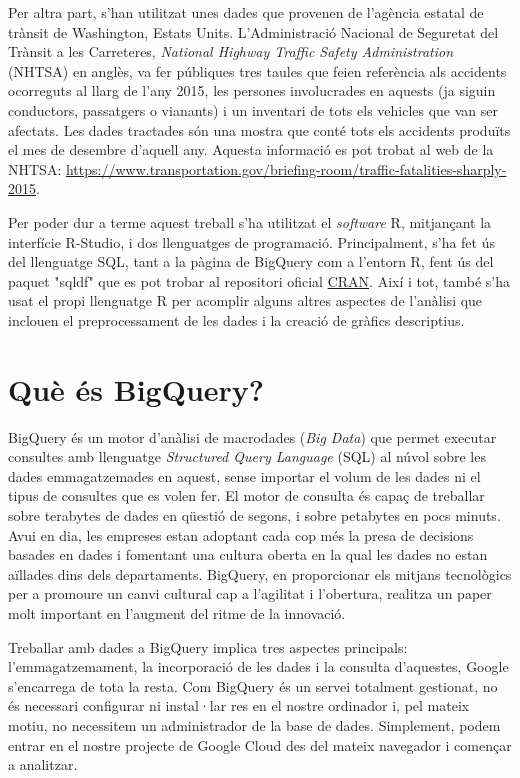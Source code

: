 \documentclass[12pt,longbibliography]{article}
\theoremstyle{definition}
\theoremstyle{remark}
\begin{document}
Per altra part, s'han utilitzat unes dades que provenen de l'agència estatal de trànsit de Washington, Estats Units. L'Administració Nacional de Seguretat del Trànsit a les Carreteres, \textit{National Highway Traffic Safety Administration} (NHTSA) en anglès, va fer públiques tres taules que feien referència als accidents ocorreguts al llarg de l'any 2015, les persones involucrades en aquests (ja siguin conductors, passatgers o vianants) i un inventari de tots els vehicles que van ser afectats. Les dades tractades són una mostra que conté tots els accidents produïts el mes de desembre d'aquell any. Aquesta informació es pot trobat al web de la NHTSA: \url{https://www.transportation.gov/briefing-room/traffic-fatalities-sharply-2015}.

Per poder dur a terme aquest treball s'ha utilitzat el \textit{software} R, mitjançant la interfície R-Studio, i dos llenguatges de programació. Principalment, s'ha fet ús del llenguatge SQL, tant a la pàgina de BigQuery com a l'entorn R, fent ús del paquet "sqldf" que es pot trobar al repositori oficial \href{https://cran.r-project.org}{CRAN}. Així i tot, també s'ha usat el propi llenguatge R per acomplir alguns altres aspectes de l'anàlisi que inclouen el preprocessament de les dades i la creació de gràfics descriptius.

\pagebreak

\section{Què és BigQuery?}

BigQuery és un motor d’anàlisi de macrodades (\textit{Big Data}) que permet executar consultes amb llenguatge \emph{Structured Query Language} (SQL) al núvol sobre les dades emmagatzemades en aquest, sense importar el volum de les dades ni el tipus de consultes que es volen fer. El motor de consulta és capaç de treballar sobre terabytes de dades en qüestió de segons, i sobre petabytes en pocs minuts. Avui en dia, les empreses estan adoptant cada cop més la presa de decisions basades en dades i fomentant una cultura oberta en la qual les dades no estan aïllades dins dels departaments. BigQuery, en proporcionar els mitjans tecnològics per a promoure un canvi cultural cap a l’agilitat i l’obertura, realitza un paper molt important en l’augment del ritme de la innovació.


Treballar amb dades a BigQuery implica tres aspectes principals: l’emmagatzemament, la incorporació de les dades i la consulta d’aquestes, Google s’encarrega de tota la resta. Com BigQuery és un servei totalment gestionat, no és necessari configurar ni instal·lar res en el nostre ordinador i, pel mateix motiu, no necessitem un administrador de la base de dades. Simplement, podem entrar en el nostre projecte de Google Cloud des del mateix navegador i començar a analitzar.
\end{document}
